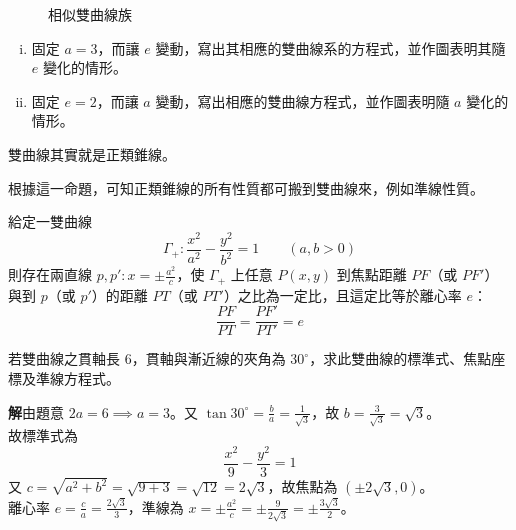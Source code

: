 \begin{figure}[htbp]
\centering
{}
\caption{相似雙曲線族}
\label{fig:b4-3-16}
\end{figure}

\begin{exercise}
\begin{enumerate}[(i)]
  \item 固定 $a=3$，而讓 $e$ 變動，寫出其相應的雙曲線系的方程式，並作圖表明其隨 $e$ 變化的情形。
  \item 固定 $e=2$，而讓 $a$ 變動，寫出相應的雙曲線方程式，並作圖表明隨 $a$ 變化的情形。
\end{enumerate}
\end{exercise}

\begin{proposition}
雙曲線其實就是正類錐線。
\end{proposition}

根據這一命題，可知正類錐線的所有性質都可搬到雙曲線來，例如準線性質。

\begin{theorem}
給定一雙曲線
\[ \Gamma_+ : \frac{x^2}{a^2} - \frac{y^2}{b^2} = 1 \qquad (a, b > 0) \]
則存在兩直線 $p, p' : x = \pm \frac{a^2}{c}$，使 $\Gamma_+$ 上任意 $P(x,y)$ 到焦點距離 $PF$（或 $PF'$）與到 $p$（或 $p'$）的距離 $PT$（或 $PT'$）之比為一定比，且這定比等於離心率 $e$：
\begin{equation}
\frac{PF}{PT} = \frac{PF'}{PT'} = e \label{eq:b4-3-2-4}
\end{equation}
\end{theorem}

\begin{example}
若雙曲線之貫軸長 6，貫軸與漸近線的夾角為 $30^\circ$，求此雙曲線的標準式、焦點座標及準線方程式。

\textbf{解}\quad 由題意 $2a = 6 \implies a = 3$。又 $\tan 30^\circ = \frac{b}{a} = \frac{1}{\sqrt{3}}$，故 $b = \frac{3}{\sqrt{3}} = \sqrt{3}$。\\
故標準式為
\[ \frac{x^2}{9} - \frac{y^2}{3} = 1 \]
又 $c = \sqrt{a^2 + b^2} = \sqrt{9 + 3} = \sqrt{12} = 2\sqrt{3}$，故焦點為 $(\pm 2\sqrt{3}, 0)$。\\
離心率 $e = \frac{c}{a} = \frac{2\sqrt{3}}{3}$，準線為 $x = \pm \frac{a^2}{c} = \pm \frac{9}{2\sqrt{3}} = \pm \frac{3\sqrt{3}}{2}$。
\end{example}

